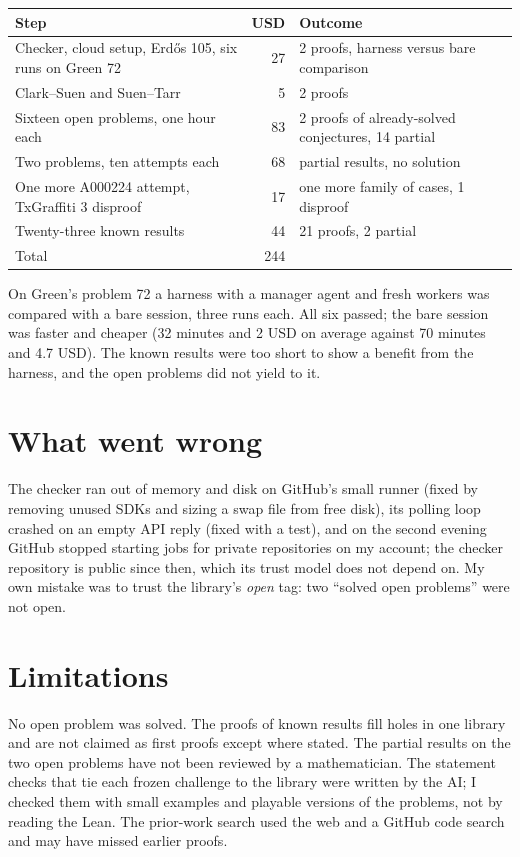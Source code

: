 \documentclass[11pt]{article}
\begin{document}
\begin{center}
\begin{tabular}{p{7.2cm}rp{6.2cm}}
\toprule
Step & USD & Outcome \\
\midrule
Checker, cloud setup, Erd\H{o}s 105, six runs on Green 72 & 27 & 2 proofs, harness versus bare comparison \\
Clark--Suen and Suen--Tarr & 5 & 2 proofs \\
Sixteen open problems, one hour each & 83 & 2 proofs of already-solved conjectures, 14 partial \\
Two problems, ten attempts each & 68 & partial results, no solution \\
One more A000224 attempt, TxGraffiti 3 disproof & 17 & one more family of cases, 1 disproof \\
Twenty-three known results & 44 & 21 proofs, 2 partial \\
\midrule
Total & 244 & \\
\bottomrule
\end{tabular}
\end{center}

On Green's problem 72 a harness with a manager agent and fresh workers was compared with a bare session, three runs each.
All six passed; the bare session was faster and cheaper (32 minutes and 2 USD on average against 70 minutes and 4.7 USD).
The known results were too short to show a benefit from the harness, and the open problems did not yield to it.

\section{What went wrong}

The checker ran out of memory and disk on GitHub's small runner (fixed by removing unused SDKs and sizing a swap file from free disk), its polling loop crashed on an empty API reply (fixed with a test), and on the second evening GitHub stopped starting jobs for private repositories on my account; the checker repository is public since then, which its trust model does not depend on.
My own mistake was to trust the library's \emph{open} tag: two ``solved open problems'' were not open.

\section{Limitations}

No open problem was solved.
The proofs of known results fill holes in one library and are not claimed as first proofs except where stated.
The partial results on the two open problems have not been reviewed by a mathematician.
The statement checks that tie each frozen challenge to the library were written by the AI; I checked them with small examples and playable versions of the problems, not by reading the Lean.
The prior-work search used the web and a GitHub code search and may have missed earlier proofs.
\end{document}
